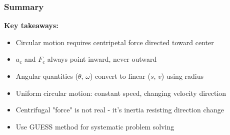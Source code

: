 \documentclass{beamer}
\begin{document}
\begin{frame}
\frametitle{Summary}
\textbf{Key takeaways:}
\pause
\begin{itemize}
    \item Circular motion requires centripetal force directed toward center
    \pause
    \item $a_c$ and $F_c$ always point inward, never outward
    \pause
    \item Angular quantities ($\theta$, $\omega$) convert to linear ($s$, $v$) using radius
    \pause
    \item Uniform circular motion: constant speed, changing velocity direction
    \pause
    \item Centrifugal "force" is not real - it's inertia resisting direction change
    \pause
    \item Use GUESS method for systematic problem solving
\end{itemize}
\end{frame}
\end{document}
